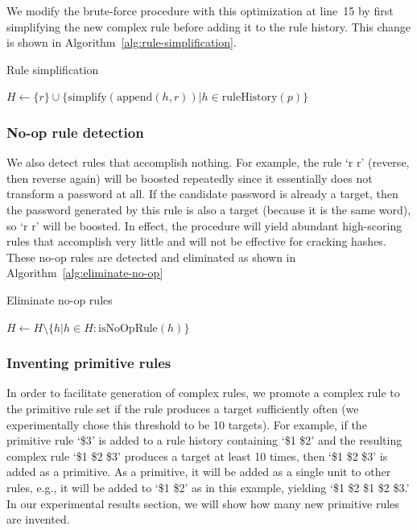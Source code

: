 \documentclass[letterpaper,twocolumn,10pt]{article}
\begin{document}
We modify the brute-force procedure with this optimization at line~15 by
first simplifying the new complex rule before adding it to the rule history.
This change is shown in Algorithm~\ref{alg:rule-simplification}.

\begin{algorithm}\caption{Rule simplification}
\begin{algorithmic}
    \State $H \gets \{r\}\cup\{\mathrm{simplify}(\mathrm{append}(h, r))|h \in%
\mathrm{ruleHistory}(p)\}$
\end{algorithmic}
\label{alg:rule-simplification}
\end{algorithm}

\subsubsection{No-op rule detection}

We also detect rules that accomplish nothing. For example, the rule `r r'
(reverse, then reverse again) will be boosted repeatedly since it essentially
does not transform a password at all. If the candidate password is already a
target, then the password generated by this rule is also a target (because it
is the same word), so `r r' will be boosted. In effect, the procedure will
yield abundant high-scoring rules that accomplish very little and will not be
effective for cracking hashes. These no-op rules are detected and eliminated as
shown in Algorithm~\ref{alg:eliminate-no-op}

\begin{algorithm}\caption{Eliminate no-op rules}
\begin{algorithmic}
    \State $H \gets H \setminus \{h|h\in H : \textrm{isNoOpRule}(h)\}$
\end{algorithmic}
\label{alg:eliminate-no-op}
\end{algorithm}

\subsubsection{Inventing primitive rules}

In order to facilitate generation of complex rules, we promote a complex rule
to the primitive rule set if the rule produces a target sufficiently often (we
experimentally chose this threshold to be 10 targets). For example, if the
primitive rule `\$3' is added to a rule history containing `\$1 \$2' and the
resulting complex rule `\$1 \$2 \$3' produces a target at least 10 times, then
`\$1 \$2 \$3' is added as a primitive. As a primitive, it will be added as a
single unit to other rules, e.g., it will be added to `\$1 \$2' as in this
example, yielding `\$1 \$2 \$1 \$2 \$3.' In our experimental results section,
we will show how many new primitive rules are invented.
\end{document}
